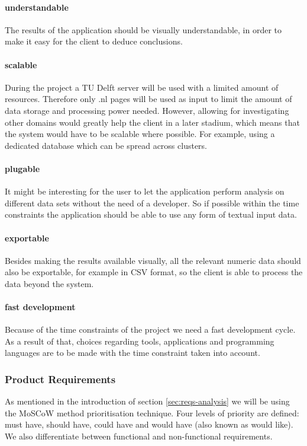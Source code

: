 \paragraph{understandable} The results of the application should be visually understandable, in order to make it easy for the client to deduce conclusions. 
\paragraph{scalable} During the project a TU Delft server will be used with a limited amount of resources. Therefore only .nl pages will be used as input to limit the amount of data storage and processing power needed. However, allowing for investigating other domains would greatly help the client in a later stadium, which means that the system would have to be scalable where possible. For example, using a dedicated database which can be spread across clusters.
\paragraph{plugable} It might be interesting for the user to let the application perform analysis on different data sets without the need of a developer. So if possible within the time constraints the application should be able to use any form of textual input data.
\paragraph{exportable} Besides making the results available visually, all the relevant numeric data should also be exportable, for example in CSV format, so the client is able to process the data beyond the system.
\paragraph{fast development} Because of the time constraints of the project we need a fast development cycle. As a result of that, choices regarding tools, applications and programming languages are to be made with the time constraint taken into account.


\subsubsection{Product Requirements}\label{sec:reqs}
As mentioned in the introduction of section \ref{sec:reqs-analysis} we will be using the MoSCoW method prioritisation technique. Four levels of priority are defined: must have, should have, could have and would have (also known as would like). We also differentiate between functional and non-functional requirements. 

